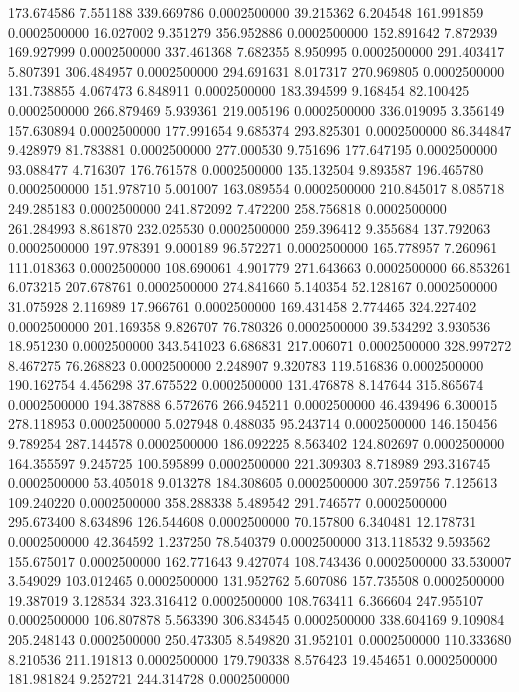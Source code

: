 173.674586 7.551188 339.669786 0.0002500000
39.215362 6.204548 161.991859 0.0002500000
16.027002 9.351279 356.952886 0.0002500000
152.891642 7.872939 169.927999 0.0002500000
337.461368 7.682355 8.950995 0.0002500000
291.403417 5.807391 306.484957 0.0002500000
294.691631 8.017317 270.969805 0.0002500000
131.738855 4.067473 6.848911 0.0002500000
183.394599 9.168454 82.100425 0.0002500000
266.879469 5.939361 219.005196 0.0002500000
336.019095 3.356149 157.630894 0.0002500000
177.991654 9.685374 293.825301 0.0002500000
86.344847 9.428979 81.783881 0.0002500000
277.000530 9.751696 177.647195 0.0002500000
93.088477 4.716307 176.761578 0.0002500000
135.132504 9.893587 196.465780 0.0002500000
151.978710 5.001007 163.089554 0.0002500000
210.845017 8.085718 249.285183 0.0002500000
241.872092 7.472200 258.756818 0.0002500000
261.284993 8.861870 232.025530 0.0002500000
259.396412 9.355684 137.792063 0.0002500000
197.978391 9.000189 96.572271 0.0002500000
165.778957 7.260961 111.018363 0.0002500000
108.690061 4.901779 271.643663 0.0002500000
66.853261 6.073215 207.678761 0.0002500000
274.841660 5.140354 52.128167 0.0002500000
31.075928 2.116989 17.966761 0.0002500000
169.431458 2.774465 324.227402 0.0002500000
201.169358 9.826707 76.780326 0.0002500000
39.534292 3.930536 18.951230 0.0002500000
343.541023 6.686831 217.006071 0.0002500000
328.997272 8.467275 76.268823 0.0002500000
2.248907 9.320783 119.516836 0.0002500000
190.162754 4.456298 37.675522 0.0002500000
131.476878 8.147644 315.865674 0.0002500000
194.387888 6.572676 266.945211 0.0002500000
46.439496 6.300015 278.118953 0.0002500000
5.027948 0.488035 95.243714 0.0002500000
146.150456 9.789254 287.144578 0.0002500000
186.092225 8.563402 124.802697 0.0002500000
164.355597 9.245725 100.595899 0.0002500000
221.309303 8.718989 293.316745 0.0002500000
53.405018 9.013278 184.308605 0.0002500000
307.259756 7.125613 109.240220 0.0002500000
358.288338 5.489542 291.746577 0.0002500000
295.673400 8.634896 126.544608 0.0002500000
70.157800 6.340481 12.178731 0.0002500000
42.364592 1.237250 78.540379 0.0002500000
313.118532 9.593562 155.675017 0.0002500000
162.771643 9.427074 108.743436 0.0002500000
33.530007 3.549029 103.012465 0.0002500000
131.952762 5.607086 157.735508 0.0002500000
19.387019 3.128534 323.316412 0.0002500000
108.763411 6.366604 247.955107 0.0002500000
106.807878 5.563390 306.834545 0.0002500000
338.604169 9.109084 205.248143 0.0002500000
250.473305 8.549820 31.952101 0.0002500000
110.333680 8.210536 211.191813 0.0002500000
179.790338 8.576423 19.454651 0.0002500000
181.981824 9.252721 244.314728 0.0002500000

